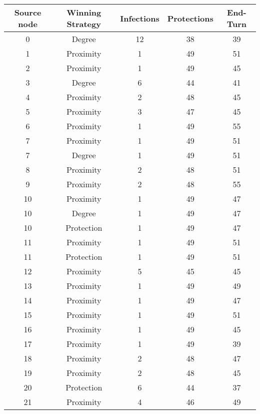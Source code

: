 \documentclass[results.tex]{subfiles}
\begin{document}
\begin{center}
  \begin{tabular}{| c || c | c | c | c |}
    \hline
    {\bfseries Source node} & {\bfseries Winning Strategy} & {\bfseries Infections} & {\bfseries Protections} & {\bfseries End-Turn} \\  %
    \hline\hline
    0 & Degree & 12 & 38 & 39 \\ 
    \hline
    1 & Proximity & 1 & 49 & 51 \\ 
    \hline
    2 & Proximity & 1 & 49 & 45 \\ 
    \hline
    3 & Degree & 6 & 44 & 41 \\ 
    \hline
    4 & Proximity & 2 & 48 & 45 \\ 
    \hline
    5 & Proximity & 3 & 47 & 45 \\ 
    \hline
    6 & Proximity & 1 & 49 & 55 \\ 
    \hline
    7 & Proximity & 1 & 49 & 51 \\ 
    \hline
    7 & Degree & 1 & 49 & 51 \\ 
    \hline
    8 & Proximity & 2 & 48 & 51 \\ 
    \hline
    9 & Proximity & 2 & 48 & 55 \\ 
    \hline
    10 & Proximity & 1 & 49 & 47 \\ 
    \hline
    10 & Degree & 1 & 49 & 47 \\ 
    \hline
    10 & Protection & 1 & 49 & 47 \\ 
    \hline
    11 & Proximity & 1 & 49 & 51 \\ 
    \hline
    11 & Protection & 1 & 49 & 51 \\ 
    \hline
    12 & Proximity & 5 & 45 & 45 \\ 
    \hline
    13 & Proximity & 1 & 49 & 49 \\ 
    \hline
    14 & Proximity & 1 & 49 & 47 \\ 
    \hline
    15 & Proximity & 1 & 49 & 51 \\ 
    \hline
    16 & Proximity & 1 & 49 & 45 \\ 
    \hline
    17 & Proximity & 1 & 49 & 39 \\ 
    \hline
    18 & Proximity & 2 & 48 & 47 \\ 
    \hline
    19 & Proximity & 2 & 48 & 45 \\ 
    \hline
    20 & Protection & 6 & 44 & 37 \\ 
    \hline
    21 & Proximity & 4 & 46 & 49 \\ 

\end{tabular}
\end{center}
\end{document}

